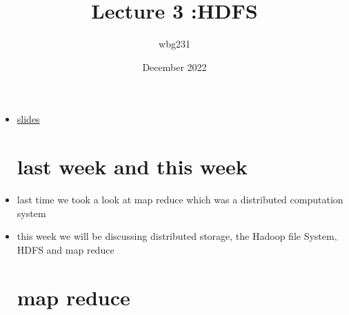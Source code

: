 \documentclass{article}
\title{Lecture 3 :HDFS}
\author{wbg231 }
\date{December 2022}
\begin{document}
\maketitle

\begin{itemize}
\item \href{https://brightspace.nyu.edu/d2l/le/lessons/261985/topics/8371478}{slides}
\section{last week and this week}
\item last time we took a look at map reduce which was a distributed computation system 
\item this week we will be discussing distributed storage, the Hadoop file System, HDFS and map reduce
\section{map reduce }

\end{itemize}
\end{document}
